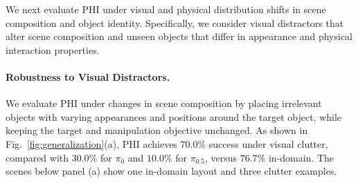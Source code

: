 \documentclass{article} %
\begin{document}


We next evaluate PHI under visual and physical distribution shifts in scene composition and object identity. Specifically, we consider visual distractors that alter scene composition and unseen objects that differ in appearance and physical interaction properties.

\paragraph{Robustness to Visual Distractors.}
We evaluate PHI under changes in scene composition by placing irrelevant objects with varying appearances and positions around the target object, while keeping the target and manipulation objective unchanged. As shown in Fig.~\ref{fig:generalization}(a), PHI achieves $70.0\%$ success under visual clutter, compared with $30.0\%$ for $\pi_0$ and $10.0\%$ for $\pi_{0.5}$, versus $76.7\%$ in-domain. 
The scenes below panel (a) show one in-domain layout and three clutter examples.
\end{document}
